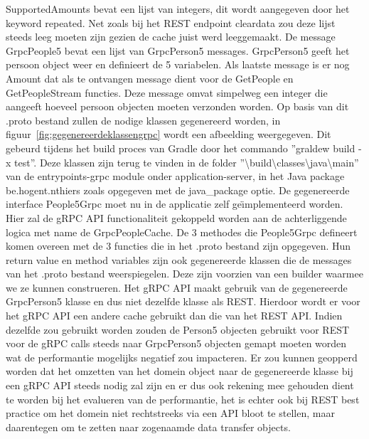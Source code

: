 SupportedAmounts bevat een lijst van integers, dit wordt aangegeven door het keyword repeated.
Net zoals bij het REST endpoint cleardata zou deze lijst steeds leeg moeten zijn gezien de cache juist werd leeggemaakt.
De message GrpcPeople5 bevat een lijst van GrpcPerson5 messages. GrpcPerson5 geeft het persoon object weer en definieert de 5 variabelen. Als laatste message is er nog
Amount dat als te ontvangen message dient voor de GetPeople en GetPeopleStream functies. Deze message omvat simpelweg een integer die aangeeft hoeveel persoon objecten moeten
verzonden worden.\newline
Op basis van dit .proto bestand zullen de nodige klassen gegenereerd worden, in figuur~\ref{fig:gegenereerdeklassengrpc} wordt een afbeelding weergegeven.
Dit gebeurd tijdens het build proces van Gradle door het commando ''graldew build -x test''.
Deze klassen zijn terug te vinden in de folder ''\textbackslash{}build\textbackslash{}classes\textbackslash{}java\textbackslash{}main'' van de entrypoints-grpc module onder application-server,
in het Java package be.hogent.nthiers zoals opgegeven met de java\_package optie. De gegenereerde interface People5Grpc moet nu in de applicatie zelf ge\"{\i}mplementeerd worden.
Hier zal de gRPC API functionaliteit gekoppeld worden aan de achterliggende logica met name de GrpcPeopleCache. De 3 methodes die People5Grpc defineert komen overeen met de 3 functies die
in het .proto bestand zijn opgegeven. Hun return value en method variables zijn ook gegenereerde klassen die de messages van het .proto bestand weerspiegelen.
Deze zijn voorzien van een builder waarmee we ze kunnen construeren.\newline
Het gRPC API maakt gebruik van de gegenereerde GrpcPerson5 klasse en dus niet dezelfde klasse als REST. Hierdoor wordt er voor het gRPC API een andere cache gebruikt dan
die van het REST API. Indien dezelfde zou gebruikt worden zouden de Person5 objecten gebruikt voor REST voor de gRPC calls steeds naar GrpcPerson5 objecten gemapt moeten worden
wat de performantie mogelijks negatief zou impacteren. Er zou kunnen geopperd worden dat het omzetten van het domein object naar de gegenereerde klasse bij een gRPC API steeds nodig
zal zijn en er dus ook rekening mee gehouden dient te worden bij het evalueren van de performantie, het is echter ook bij REST best practice om het domein niet rechtstreeks
via een API bloot te stellen, maar daarentegen om te zetten naar zogenaamde data transfer objects.\newline
~\autocite{quarkusgRPC}\\
~\autocite{DTO}\\
~\autocite{gRPCBestPractices}\\
~\autocite{builderPattern}\\

